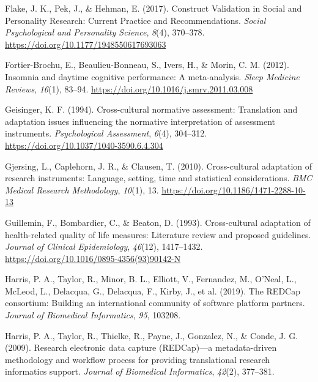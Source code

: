\documentclass[
  ,doc,11pt, twoside,floatsintext]{apa6}
\newlength{\cslhangindent}
\newlength{\cslentryspacingunit} %
\newenvironment{CSLReferences}[2] %
 {%
  \setlength{\parindent}{0pt}
  \ifodd #1
  \let\oldpar\par
  \def\par{\hangindent=\cslhangindent\oldpar}
  \fi
  \setlength{\parskip}{#2\cslentryspacingunit}
 }%
 {}
\begin{document}
\begin{CSLReferences}{1}{0}
\leavevmode{}%
Flake, J. K., Pek, J., \& Hehman, E. (2017). Construct {Validation} in {Social} and {Personality Research}: {Current Practice} and {Recommendations}. \emph{Social Psychological and Personality Science}, \emph{8}(4), 370--378. \url{https://doi.org/10.1177/1948550617693063}

\leavevmode{}%
Fortier-Brochu, E., Beaulieu-Bonneau, S., Ivers, H., \& Morin, C. M. (2012). Insomnia and daytime cognitive performance: A meta-analysis. \emph{Sleep Medicine Reviews}, \emph{16}(1), 83--94. \url{https://doi.org/10.1016/j.smrv.2011.03.008}

\leavevmode{}%
Geisinger, K. F. (1994). Cross-cultural normative assessment: {Translation} and adaptation issues influencing the normative interpretation of assessment instruments. \emph{Psychological Assessment}, \emph{6}(4), 304--312. \url{https://doi.org/10.1037/1040-3590.6.4.304}

\leavevmode{}%
Gjersing, L., Caplehorn, J. R., \& Clausen, T. (2010). Cross-cultural adaptation of research instruments: Language, setting, time and statistical considerations. \emph{BMC Medical Research Methodology}, \emph{10}(1), 13. \url{https://doi.org/10.1186/1471-2288-10-13}

\leavevmode{}%
Guillemin, F., Bombardier, C., \& Beaton, D. (1993). Cross-cultural adaptation of health-related quality of life measures: {Literature} review and proposed guidelines. \emph{Journal of Clinical Epidemiology}, \emph{46}(12), 1417--1432. \url{https://doi.org/10.1016/0895-4356(93)90142-N}

\leavevmode{}%
Harris, P. A., Taylor, R., Minor, B. L., Elliott, V., Fernandez, M., O'Neal, L., McLeod, L., Delacqua, G., Delacqua, F., Kirby, J., et al. (2019). The REDCap consortium: Building an international community of software platform partners. \emph{Journal of Biomedical Informatics}, \emph{95}, 103208.

\leavevmode{}%
Harris, P. A., Taylor, R., Thielke, R., Payne, J., Gonzalez, N., \& Conde, J. G. (2009). Research electronic data capture (REDCap)---a metadata-driven methodology and workflow process for providing translational research informatics support. \emph{Journal of Biomedical Informatics}, \emph{42}(2), 377--381.


\end{CSLReferences}
\end{document}
